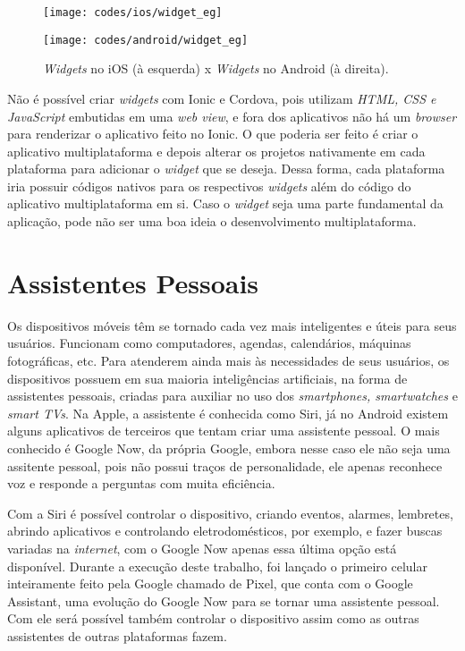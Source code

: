 \begin{figure}[H]
	\centering
	\begin{minipage}{.5\textwidth}
		\centering
		\texttt{[image: codes/ios/widget\_eg]}
	\end{minipage}%
	\begin{minipage}{.5\textwidth}
		\centering
		\texttt{[image: codes/android/widget\_eg]}
	\end{minipage}
\caption[\textit{Widgets} no iOS (à esquerda) x \textit{Widgets} no Android (à direita).]{\textit{Widgets} no iOS (à esquerda) x \textit{Widgets} no Android (à direita).}
\label{fig:widgets_sample}
\end{figure}

Não é possível criar \textit{widgets} com Ionic e Cordova, pois utilizam \textit{HTML, CSS e JavaScript} embutidas em uma \textit{web view}, e fora dos aplicativos não há um \textit{browser} para renderizar o aplicativo 
feito no Ionic. O que poderia ser feito é criar o aplicativo multiplataforma e depois alterar os projetos nativamente em cada plataforma para adicionar o \textit{widget} que se deseja. Dessa forma, cada plataforma iria 
possuir códigos nativos para os respectivos \textit{widgets} além do código do aplicativo multiplataforma em si. Caso o \textit{widget} seja uma parte fundamental da aplicação, pode não ser uma boa ideia o 
desenvolvimento multiplataforma. 

\section{Assistentes Pessoais} \label{subsubsec:siri}
Os dispositivos móveis têm se tornado cada vez mais inteligentes e úteis para seus usuários. Funcionam como computadores, agendas, calendários, máquinas fotográficas, etc. Para atenderem ainda mais às necessidades de 
seus usuários, os dispositivos possuem em sua maioria inteligências artificiais, na forma de assistentes pessoais, criadas para auxiliar no uso dos \textit{smartphones, smartwatches} e \textit{smart TVs}. 
Na Apple, a assistente é conhecida como Siri, já no Android existem alguns aplicativos de terceiros que tentam criar uma assistente pessoal. O mais conhecido é Google Now, da própria Google, 
embora nesse caso ele não seja uma assitente pessoal, pois não possui traços de personalidade, ele apenas reconhece voz e responde a perguntas com muita eficiência.

Com a Siri é possível controlar o dispositivo, criando eventos, alarmes, lembretes, abrindo aplicativos e controlando eletrodomésticos, por exemplo, e fazer buscas variadas na \textit{internet}, com o Google Now 
apenas essa última opção está disponível. Durante a execução deste trabalho, foi lançado o primeiro celular inteiramente feito pela Google chamado de Pixel, que conta com o Google Assistant, uma evolução do Google Now 
para se tornar uma assistente pessoal. Com ele será possível também controlar o dispositivo assim como as outras assistentes de outras plataformas fazem. 

